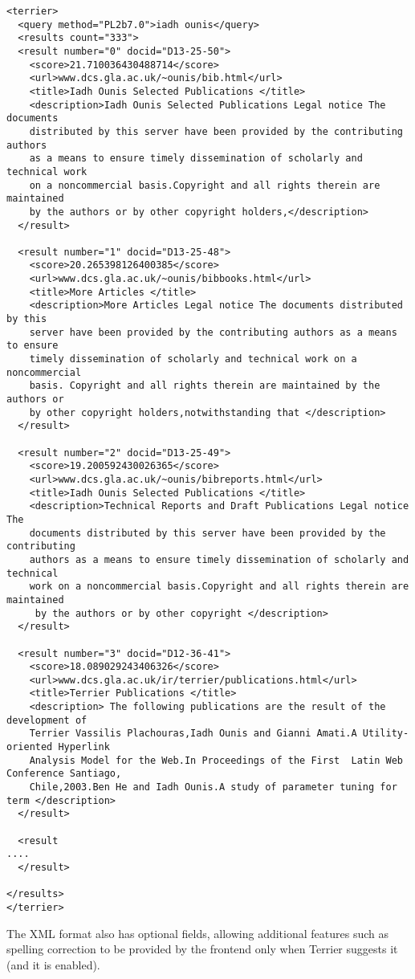 \renewcommand{\baselinestretch}{1.0}
\begin{verbatim}
<terrier>
  <query method="PL2b7.0">iadh ounis</query>
  <results count="333">
  <result number="0" docid="D13-25-50">
    <score>21.710036430488714</score>
    <url>www.dcs.gla.ac.uk/~ounis/bib.html</url>
    <title>Iadh Ounis Selected Publications </title>
    <description>Iadh Ounis Selected Publications Legal notice The documents 
    distributed by this server have been provided by the contributing authors
    as a means to ensure timely dissemination of scholarly and technical work
    on a noncommercial basis.Copyright and all rights therein are maintained
    by the authors or by other copyright holders,</description>
  </result>

  <result number="1" docid="D13-25-48">
    <score>20.265398126400385</score>
    <url>www.dcs.gla.ac.uk/~ounis/bibbooks.html</url>
    <title>More Articles </title>
    <description>More Articles Legal notice The documents distributed by this
    server have been provided by the contributing authors as a means to ensure
    timely dissemination of scholarly and technical work on a noncommercial 
    basis. Copyright and all rights therein are maintained by the authors or 
    by other copyright holders,notwithstanding that </description>
  </result>

  <result number="2" docid="D13-25-49">
    <score>19.200592430026365</score>
    <url>www.dcs.gla.ac.uk/~ounis/bibreports.html</url>
    <title>Iadh Ounis Selected Publications </title>
    <description>Technical Reports and Draft Publications Legal notice The 
    documents distributed by this server have been provided by the contributing
    authors as a means to ensure timely dissemination of scholarly and technical
    work on a noncommercial basis.Copyright and all rights therein are maintained
     by the authors or by other copyright </description>
  </result>

  <result number="3" docid="D12-36-41">
    <score>18.089029243406326</score>
    <url>www.dcs.gla.ac.uk/ir/terrier/publications.html</url>
    <title>Terrier Publications </title>
    <description> The following publications are the result of the development of
    Terrier Vassilis Plachouras,Iadh Ounis and Gianni Amati.A Utility-oriented Hyperlink
    Analysis Model for the Web.In Proceedings of the First  Latin Web Conference Santiago,
    Chile,2003.Ben He and Iadh Ounis.A study of parameter tuning for term </description>
  </result>
  
  <result 
....
  </result>

</results>
</terrier>
\end{verbatim}
\renewcommand{\baselinestretch}{1.5}
The XML format also has optional fields, allowing additional features such as spelling correction to be provided by the frontend only when Terrier suggests it (and it is enabled).

